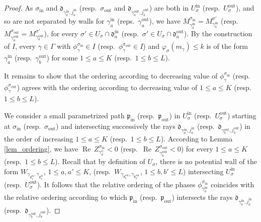 \documentclass[12pt, a4paper]{amsart}
\newcommand\fd{\mathfrak d}
\newcommand\fp{\mathfrak p}
\newcommand\Rea{\operatorname{Re}\,}
\newcommand\iin{\mathrm{in}}
\newcommand\oout{\mathrm{out}}
\begin{document}
\begin{proof}
As $\sigma_{\iin}$ and $\fd_{\gamma_a^{\iin},j_a^\iin}$
(resp.\ $\sigma_{\oout}$ and $\fd_{\gamma_a^{\oout},j_a^\oout}$)
are both 
in $U_\sigma^{\iin}$ (resp.\ $U_\sigma^{\oout}$), and so are not separated by walls for $\gamma_a^{\iin}$ (reps.\ $\gamma_a^{\oout}$), we have $M_{\gamma_a^{\iin}}^{\sigma_{\iin}}=M_{\gamma_a^{\iin}}^{\sigma'}$
(resp.\ $M_{\gamma_a^{\oout}}^{\sigma_{\oout}}=M_{\gamma_a^{\oout}}^{\sigma'}$), for every 
$\sigma' \in U_\sigma \cap \fd_a^{\iin}$ (resp.\ $\sigma' \in U_\sigma \cap \fd_a^{\oout}$).
By the construction of $I$, every $\gamma \in \Gamma$ with $\phi_\gamma^{\sigma_\iin} \in I$
(resp.\ $\phi_\gamma^{\sigma_\oout} \in I$)
and $\varphi_\sigma(m_{\gamma}) \leqslant k$ is of the form $\gamma_a^\iin$ (resp.\ $\gamma_b^{\oout}$) for some $1 \leqslant a \leqslant K$ (resp.\ $1 \leqslant b \leqslant L$).

It remains to show that the ordering according to decreasing value of 
$\phi_\gamma^{\sigma_\iin}$ (resp.\ $\phi_\gamma^{\sigma_\oout}$)
agrees with the ordering according to decreasing value of 
$1 \leqslant a \leqslant K$ (resp.\ $1 \leqslant b \leqslant L$).

We consider a small parametrized path $\fp_\iin$ (resp.\ $\fp_\oout$)
in $U_\sigma^\iin$ (resp.\ $U_\sigma^\oout$) starting at $\sigma_\iin$
(resp.\ $\sigma_\oout$) and intersecting successively 
the rays 
$\fd_{\gamma_{a}^\iin,j_a^\iin}$ (resp.\ $\fd_{\gamma_{b}^\oout,j_b^\oout}$)
in the order of increasing $1 \leqslant a \leqslant K$ (resp.\ 
$1 \leqslant b \leqslant L$). 
According to Lemma \ref{lem_ordering}, we have
$\Rea Z_{\gamma_a^\in}^{\sigma_\iin}<0$ (resp.\ $\Rea Z_{\gamma_a^\oout}^{\sigma_\oout}<0$) for every $1 \leqslant a \leqslant K$ (resp.\ $1 \leqslant b \leqslant L$).
Recall that by definition of $U_\sigma$, there is no potential wall of the form 
$W_{\gamma_{\fd_a^{\iin}},\gamma_{\fd_{a'}^{\iin}}}$, 
$1 \leqslant a, a' \leqslant K$,
(resp.\ $W_{\gamma_{\fd_b^{\oout}},\gamma_{\fd_{b'}^{\oout}}}$, 
$1 \leqslant b, b' \leqslant L$) intersecting $U_\sigma^\iin$
(resp.\ $U_\sigma^\oout$).
It follows that the relative ordering of the phases
$\phi_{\gamma_a^\iin}^{\sigma_\iin}$ coincides with the relative 
ordering according to which $\fp_\iin$ (resp.\ $\fp_\oout$) intersects 
the rays $\fd_{\gamma_{a}^\iin,j_a^\iin}$ (resp.\ $\fd_{\gamma_{b}^\oout,j_b^\oout}$).
\end{proof}
\end{document}
